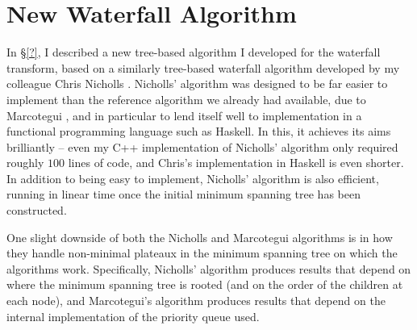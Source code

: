 \iffalse
+ Does help to improve the segmentation results somewhat
+ Quick to run
+ Easy to understand
+ Easy to implement
- Rather poor end results compared to e.g.~anisotropic diffusion filtering
\fi

\section{New Waterfall Algorithm}

In \S\ref{?}, I described a new tree-based algorithm I developed for the waterfall transform, based on a similarly tree-based waterfall algorithm developed by my colleague Chris Nicholls \cite{nicholls09}. Nicholls' algorithm was designed to be far easier to implement than the reference algorithm we already had available, due to Marcotegui \cite{marcotegui05}, and in particular to lend itself well to implementation in a functional programming language such as Haskell. In this, it achieves its aims brilliantly -- even my C++ implementation of Nicholls' algorithm only required roughly $100$ lines of code, and Chris's implementation in Haskell is even shorter. In addition to being easy to implement, Nicholls' algorithm is also efficient, running in linear time once the initial minimum spanning tree has been constructed.

One slight downside of both the Nicholls and Marcotegui algorithms is in how they handle non-minimal plateaux in the minimum spanning tree on which the algorithms work. Specifically, Nicholls' algorithm produces results that depend on where the minimum spanning tree is rooted (and on the order of the children at each node), and Marcotegui's algorithm produces results that depend on the internal implementation of the priority queue used.


